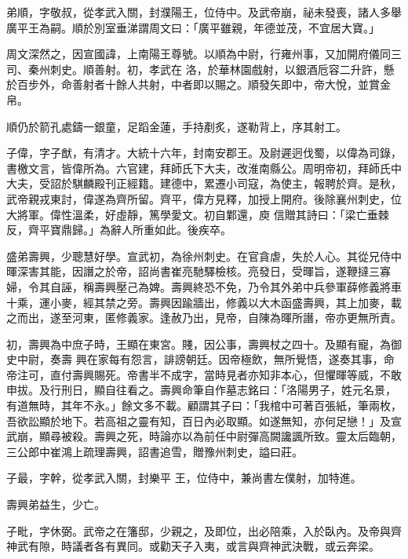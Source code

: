 \begin{pinyinscope}
 弟順，字敬叔，從孝武入關，封濮陽王，位侍中。及武帝崩，祕未發喪，諸人多舉廣平王為嗣。順於別室垂涕謂周文曰：「廣平雖親，年德並茂，不宜居大寶。」



 周文深然之，因宣國諱，上南陽王尊號。以順為中尉，行雍州事，又加開府儀同三司、秦州刺史。順善射。初，孝武在
 洛，於華林園戲射，以銀酒卮容二升許，懸於百步外，命善射者十餘人共射，中者即以賜之。順發矢即中，帝大悅，並賞金帛。



 順仍於箭孔處鑄一銀童，足蹈金蓮，手持剷炙，遂勒背上，序其射工。



 子偉，字子猷，有清才。大統十六年，封南安郡王。及尉遲迥伐蜀，以偉為司錄，書檄文言，皆偉所為。六官建，拜師氏下大夫，改淮南縣公。周明帝初，拜師氏中大夫，受詔於騏麟殿刊正經籍。建德中，累遷小司寇，為使主，報聘於齊。是秋，武帝親戎東討，偉遂為齊所留。齊平，偉方見釋，加授上開府。後除襄州刺史，位大將軍。偉性溫柔，好虛靜，篤學愛文。初自鄴還，庾
 信贈其詩曰：「梁亡垂棘反，齊平寶鼎歸。」為辭人所重如此。後疾卒。



 盛弟壽興，少聰慧好學。宣武初，為徐州刺史。在官貪虐，失於人心。其從兄侍中暉深害其能，因譖之於帝，詔尚書崔亮馳驛檢核。亮發日，受暉旨，遂鞭撻三寡婦，令其自誣，稱壽興壓己為婢。壽興終恐不免，乃令其外弟中兵參軍薛修義將車十乘，運小麥，經其禁之旁。壽興因踰牆出，修義以大木函盛壽興，其上加麥，載之而出，遂至河東，匿修義家。逢赦乃出，見帝，自陳為暉所譖，帝亦更無所責。



 初，壽興為中庶子時，王顯在東宮。賤，因公事，壽興杖之四十。及顯有寵，為御史中尉，奏壽
 興在家每有怨言，誹謗朝廷。因帝極飲，無所覺悟，遂奏其事，命帝注可，直付壽興賜死。帝書半不成字，當時見者亦知非本心，但懼暉等威，不敢申拔。及行刑日，顯自往看之。壽興命筆自作墓志銘曰：「洛陽男子，姓元名景，有道無時，其年不永。」餘文多不載。顧謂其子曰：「我棺中可著百張紙，筆兩枚，吾欲訟顯於地下。若高祖之靈有知，百日內必取顯。如遂無知，亦何足戀！」及宣武崩，顯尋被殺。壽興之死，時論亦以為前任中尉彈高闕讒諷所致。靈太后臨朝，三公郎中崔鴻上疏理壽興，詔書追雪，贈豫州刺史，謚曰莊。



 子最，字幹，從孝武入關，封樂平
 王，位侍中，兼尚書左僕射，加特進。



 壽興弟益生，少亡。



 子毗，字休弼。武帝之在籓邸，少親之，及即位，出必陪乘，入於臥內。及帝與齊神武有隙，時議者各有異同。或勸天子入夷，或言與齊神武決戰，或云奔梁。




\end{pinyinscope}
